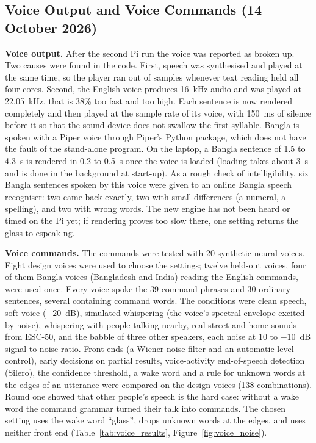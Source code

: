 \subsection{Voice Output and Voice Commands (14 October 2026)}
\label{sec:voice_results}
\textbf{Voice output.} After the second Pi run the voice was reported as broken up. Two causes were found in the code. First, speech was synthesised and played at the same time, so the player ran out of samples whenever text reading held all four cores. Second, the English voice produces 16~kHz audio and was played at 22.05~kHz, that is 38\% too fast and too high. Each sentence is now rendered completely and then played at the sample rate of its voice, with 150~ms of silence before it so that the sound device does not swallow the first syllable. Bangla is spoken with a Piper voice through Piper's Python package, which does not have the fault of the stand-alone program. On the laptop, a Bangla sentence of 1.5 to 4.3~s is rendered in 0.2 to 0.5~s once the voice is loaded (loading takes about 3~s and is done in the background at start-up). As a rough check of intelligibility, six Bangla sentences spoken by this voice were given to an online Bangla speech recogniser: two came back exactly, two with small differences (a numeral, a spelling), and two with wrong words. The new engine has not been heard or timed on the Pi yet; if rendering proves too slow there, one setting returns the glass to espeak-ng.

\textbf{Voice commands.} The commands were tested with 20 synthetic neural voices. Eight design voices were used to choose the settings; twelve held-out voices, four of them Bangla voices (Bangladesh and India) reading the English commands, were used once. Every voice spoke the 39 command phrases and 30 ordinary sentences, several containing command words. The conditions were clean speech, soft voice ($-20$~dB), simulated whispering (the voice's spectral envelope excited by noise), whispering with people talking nearby, real street and home sounds from ESC-50, and the babble of three other speakers, each noise at 10 to $-10$~dB signal-to-noise ratio. Front ends (a Wiener noise filter and an automatic level control), early decisions on partial results, voice-activity end-of-speech detection (Silero), the confidence threshold, a wake word and a rule for unknown words at the edges of an utterance were compared on the design voices (138 combinations). Round one showed that other people's speech is the hard case: without a wake word the command grammar turned their talk into commands. The chosen setting uses the wake word ``glass'', drops unknown words at the edges, and uses neither front end (Table~\ref{tab:voice_results}, Figure~\ref{fig:voice_noise}).

